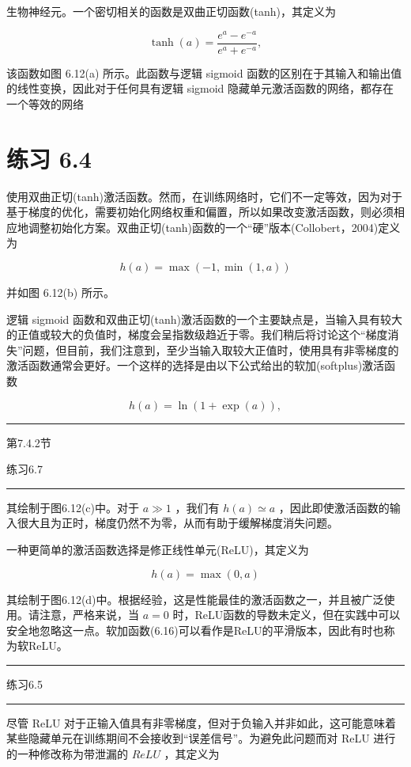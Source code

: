 \documentclass[10pt]{report}
\newcommand{\HRule}{\begin{center}\rule{0.9\linewidth}{0.2mm}\end{center}}
\begin{document}
生物神经元。一个密切相关的函数是双曲正切函数(tanh)，其定义为

\[
\tanh \left( a\right)  = \frac{{e}^{a} - {e}^{-a}}{{e}^{a} + {e}^{-a}}, \tag{6.14}
\]

该函数如图 6.12(a) 所示。此函数与逻辑 sigmoid 函数的区别在于其输入和输出值的线性变换，因此对于任何具有逻辑 sigmoid 隐藏单元激活函数的网络，都存在一个等效的网络

\section*{练习 6.4}

使用双曲正切(tanh)激活函数。然而，在训练网络时，它们不一定等效，因为对于基于梯度的优化，需要初始化网络权重和偏置，所以如果改变激活函数，则必须相应地调整初始化方案。双曲正切(tanh)函数的一个“硬”版本(Collobert，2004)定义为

\[
h\left( a\right)  = \max \left( {-1,\min \left( {1,a}\right) }\right)  \tag{6.15}
\]

并如图 6.12(b) 所示。

逻辑 sigmoid 函数和双曲正切(tanh)激活函数的一个主要缺点是，当输入具有较大的正值或较大的负值时，梯度会呈指数级趋近于零。我们稍后将讨论这个“梯度消失”问题，但目前，我们注意到，至少当输入取较大正值时，使用具有非零梯度的激活函数通常会更好。一个这样的选择是由以下公式给出的软加(softplus)激活函数

\[
h\left( a\right)  = \ln \left( {1 + \exp \left( a\right) }\right) , \tag{6.16}
\]

\HRule

第7.4.2节

练习6.7

\HRule

其绘制于图6.12(c)中。对于 \(a \gg  1\) ，我们有 \(h\left( a\right)  \simeq  a\) ，因此即使激活函数的输入很大且为正时，梯度仍然不为零，从而有助于缓解梯度消失问题。

一种更简单的激活函数选择是修正线性单元(ReLU)，其定义为

\[
h\left( a\right)  = \max \left( {0,a}\right)  \tag{6.17}
\]

其绘制于图6.12(d)中。根据经验，这是性能最佳的激活函数之一，并且被广泛使用。请注意，严格来说，当 \(a = 0\) 时，ReLU函数的导数未定义，但在实践中可以安全地忽略这一点。软加函数(6.16)可以看作是ReLU的平滑版本，因此有时也称为软ReLU。

\HRule

练习6.5

\HRule

尽管 ReLU 对于正输入值具有非零梯度，但对于负输入并非如此，这可能意味着某些隐藏单元在训练期间不会接收到“误差信号”。为避免此问题而对 ReLU 进行的一种修改称为带泄漏的 \({ReLU}\) ，其定义为
\end{document}
